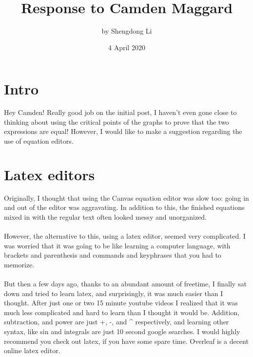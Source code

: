 \documentclass[letterpaper, 12pt]{article}
\begin{document}
\title{Response to Camden Maggard}
\author{by Shengdong Li}
\date{4 April 2020}
\maketitle

\section{Intro}
Hey Camden! Really good job on the initial post, I haven't even gone close to thinking about using the critical points of the graphs to prove that the two expressions are equal!
However, I would like to make a suggestion regarding the use of equation editors.

\section{Latex editors}
Originally, I thought that using the Canvas equation editor was slow too: going in and out of the editor was aggravating. In addition to this, the finished equations mixed in with the regular text often looked messy and unorganized. \\~\\
However, the alternative to this, using a latex editor, seemed very complicated. I was worried that it was going to be like learning a computer language, with brackets and parenthesis and commands and keyphrases that you had to memorize. \\~\\
But then a few days ago, thanks to an abundant amount of freetime, I finally sat down and tried to learn latex, and surprisingly, it was much easier than I thought. After just one or two 15 minute youtube videos I realized that it was much less complicated and hard to learn than I thought it would be. Addition, subtraction, and power are just \string+, \string-, and \string^ respectively, and learning other syntax, like sin and integrals are just 10 second google searches.
I would highly recommend you check out latex, if you have some spare time. Overleaf is a decent online latex editor.
\end{document}
